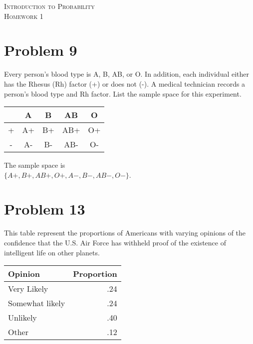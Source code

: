 \documentclass{article}
\newcommand{\classname}{
Introduction to Probability
}
\newcommand{\assignment}{
1
}
\begin{document}


\begin{center}
\textsc{\Large \classname}\\[.3cm]
\textsc{\Large Homework \assignment}
\end{center}

\section*{Problem 9}
Every person's blood type is A, B, AB, or O. In addition, each individual either has the Rhesus (Rh) factor (+) or does not (-). A medical technician records a person's blood type and Rh factor. List the sample space for this experiment.
\begin{multicols}{2}

\begin{tabular}{c | c | c | c | c}
\ & A  & B  & AB  & O  \\
\hline
+ & A+ & B+ & AB+ & O+ \\
\hline
- & A- & B- & AB- & O- \\
\hline
\end{tabular}

\vfill
\columnbreak

The sample space is \\ $\{A+,B+,AB+,O+,A-,B-,AB-,O-\}$.

\end{multicols}




\section*{Problem 13}

\begin{multicols}{2}
\noindent
This table represent the proportions of Americans with varying opinions of the confidence that the U.S. Air Force has withheld proof of the existence of intelligent life on other planets.

\begin{tabular}{l r}
\hline
Opinion         & Proportion \\
\hline
Very Likely     & .24 \\
Somewhat likely & .24 \\
Unlikely        & .40 \\
Other           & .12 \\
\hline

\end{tabular}

\end{multicols}
\end{document}
